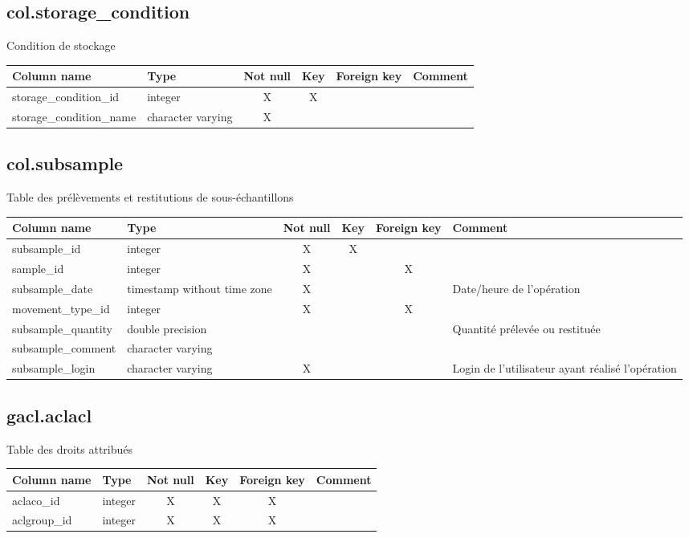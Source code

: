 \subsection{col.storage\_condition}
Condition de stockage

\begin{tabular}{|l| p{2cm}|c|c|c| p{3cm}|}
\hline
Column name & Type & Not null & Key & Foreign key & Comment \\
\hline
storage\_condition\_id & integer & X & X & & \\
\hline
storage\_condition\_name & character varying & X & & & \\
\hline
\end{tabular}
\subsection{col.subsample}
Table des prélèvements et restitutions de sous-échantillons

\begin{tabular}{|l| p{2cm}|c|c|c| p{3cm}|}
\hline
Column name & Type & Not null & Key & Foreign key & Comment \\
\hline
subsample\_id & integer & X & X & & \\
\hline
sample\_id & integer & X & & X & \\
\hline
subsample\_date & timestamp without time zone & X & & & Date/heure de l'opération\\
\hline
movement\_type\_id & integer & X & & X & \\
\hline
subsample\_quantity & double precision & & & & Quantité prélevée ou restituée\\
\hline
subsample\_comment & character varying & & & & \\
\hline
subsample\_login & character varying & X & & & Login de l'utilisateur ayant réalisé l'opération\\
\hline
\end{tabular}
\subsection{gacl.aclacl}
Table des droits attribués

\begin{tabular}{|l| p{2cm}|c|c|c| p{3cm}|}
\hline
Column name & Type & Not null & Key & Foreign key & Comment \\
\hline
aclaco\_id & integer & X & X & X & \\
\hline
aclgroup\_id & integer & X & X & X & \\
\hline
\end{tabular}
